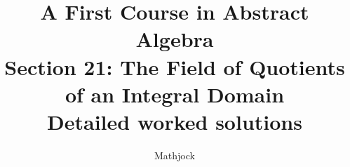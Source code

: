 
\title{\textbf{A First Course in Abstract Algebra}\\[0.3em]Section 21: The Field of Quotients of an Integral Domain\\[0.3em]\large Detailed worked solutions}
\author{Mathjock}
\date{}

\maketitle
\bookinfo
\tableofcontents
\clearpage
\renewcommand{\thesection}{21}
\renewcommand{\theHsection}{fraleigh.21}


